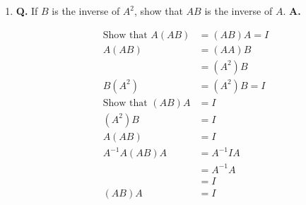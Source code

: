 \documentclass[main.tex]{subfiles}
\begin{document}
\begin{enumerate}
$$\begin{aligned}
\begin{array}{ll}
    \end{array}\right]^{-1} & = \frac{1}{1-0}\left[\begin{array}{cc}
    1 & -1 \\
    0 & 1
    \end{array}\right] \\
    &=\left[\begin{array}{cc}
    1 & 0 \\
    -1 & 1
    \end{array}\right]\\
    B^{-1} &= [A]^{-1}\left[\begin{array}{cc}
    1 & 0 \\
    -1 & 1
    \end{array}\right]
    \end{aligned}
    $$
    
    \item [18.] \textbf{Q.} If $B$ is the inverse of $A^{2}$, show that $A B$ is the inverse of $A$. 
    \textbf{A.}
    
    $$
    \begin{aligned}
    \text{Show that } A(A B) &= (A B) A = I\\
    A(A B) &= (A A) B \\
    &= \left(A^{2}\right) B \\
    B\left(A^{2}\right) &= \left(A^{2}\right) B=I\\
    \text{Show that } (A B) A &= I\\
    \left(A^{2}\right) B & =I \\
    A(A B) & = I\\
    A^{-1} A(A B) A &= A^{-1} I A \\
    &=A^{-1} A \\
    &=I\\
    (A B) A &= I
    \end{aligned}
    $$
    

\end{enumerate}
\end{document}
